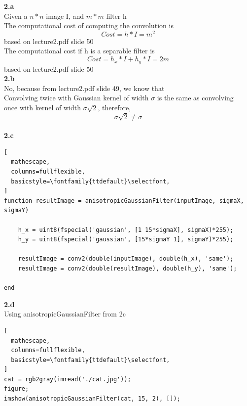 \documentclass[11pt]{article}
\begin{document}
\noindent
\textbf{2.a} \\
Given a $n * n$ image I, and $m * m$ filter h\\
The computational cost of computing the convolution is
$$Cost = h * I = m^2$$ 
based on lecture2.pdf slide 50 \\

\noindent
The computational cost if h is a separable filter is\\
$$Cost = h_x * I + h_y * I = 2m$$
based on lecture2.pdf slide 50 \\

\noindent
\textbf{2.b} \\
No, because from lecture2.pdf slide 49, we know that \\
Convolving twice with Gaussian kernel of width $\sigma$ is the same as convolving \\
once with kernel of width $\sigma \sqrt{2}$, therefore,
$$\sigma \sqrt{2} \neq \sigma$$ \\

\noindent
\textbf{2.c} 
\begin{lstlisting}[
  mathescape,
  columns=fullflexible,
  basicstyle=\fontfamily{ttdefault}\selectfont,
]
function resultImage = anisotropicGaussianFilter(inputImage, sigmaX, sigmaY) 

    h_x = uint8(fspecial('gaussian', [1 15*sigmaX], sigmaX)*255); 
    h_y = uint8(fspecial('gaussian', [15*sigmaY 1], sigmaY)*255); 

    resultImage = conv2(double(inputImage), double(h_x), 'same');
    resultImage = conv2(double(resultImage), double(h_y), 'same');
    
end
\end{lstlisting}
\newpage
\noindent
\textbf{2.d} \\
Using anisotropicGaussianFilter from 2c \\
\begin{lstlisting}[
  mathescape,
  columns=fullflexible,
  basicstyle=\fontfamily{ttdefault}\selectfont,
]
cat = rgb2gray(imread('./cat.jpg'));
figure;
imshow(anisotropicGaussianFilter(cat, 15, 2), []);
\end{lstlisting}
\end{document}
